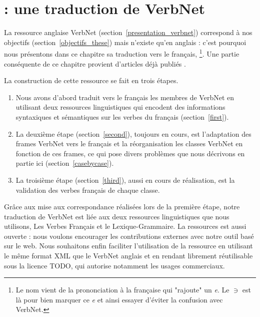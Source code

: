 \chapter{\verbenet{} : une traduction de VerbNet}
\label{ch:verbnet}

La ressource anglaise VerbNet (section~\ref{presentation_verbnet}) correspond à
nos objectifs (section~\ref{objectifs_these}) mais n'existe qu'en anglais :
c'est pourquoi nous présentons dans ce chapitre sa traduction vers le français,
\verbenet{}\footnote{Le nom vient de la prononciation à la française qui
"rajoute" un \emph{e}. Le $\ni$ est là pour bien marquer ce \emph{e} et ainsi
essayer d'éviter la confusion avec VerbNet.}. Une partie conséquente de ce
chapitre provient d'articles déjà publiés
\citep{danlos2014vers,pradet2014adapting}.

La construction de cette ressource se fait en trois étapes.
\begin{enumerate}
    \item Nous avons d'abord traduit vers le français les membres de VerbNet en
        utilisant deux ressources linguistiques qui encodent des informations
        syntaxiques et sémantiques sur les verbes du français
        (section~\ref{first}).
    \item La deuxième étape (section~\ref{second}), toujours en cours, est
        l'adaptation des frames VerbNet vers le français et la réorganisation
        les classes VerbNet en fonction de ces frames, ce qui pose divers
        problèmes que nous décrivons en partie ici (section~\ref{casebycase}).
    \item La troisième étape (section~\ref{third}), aussi en cours de
        réalisation, est la validation des verbes français de chaque classe.
\end{enumerate}

Grâce aux mise aux correspondance réalisées lors de la première étape, notre
traduction de VerbNet est liée aux deux ressources linguistiques que nous
utilisons, Les Verbes Français et le Lexique-Grammaire. La ressources est aussi
ouverte : nous voulons encourager les contributions externes avec notre outil
basé sur le web. Nous souhaitons enfin faciliter l'utilisation de la ressource
en utilisant le même format XML que le VerbNet anglais et en rendant
\verbenet{} librement réutilisable sous la licence TODO, qui autorise notamment
les usages commerciaux.

